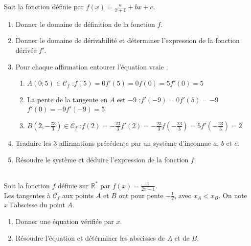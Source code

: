 \documentclass[main.tex]{subfiles}
\begin{document}
 \begin{exercise}\label{chapter04:exercice:determinerfonction02}   Soit la fonction définie  par $f(x)=\frac{a}{x+1}+bx+c$.
	\begin{enumerate}[label={\arabic*)}, leftmargin=*]
		\item Donner le domaine de définition de la fonction $f$.
		\item Donner le domaine de dérivabilité et déterminer l'expression de la fonction dérivée $f'$.
		\item Pour chaque affirmation entourer l'équation vraie :
		\begin{enumerate}[leftmargin=*]
			\item $A(0;5)\in\mathscr{C}_f$ :\hfill $f(5)=0$\hfill $f'(5)=0$\hfill $f(0)=5$\hfill $f'(0)=5$
			\item La pente de la tangente en $A$ est $-9$ :\hfill $f'(-9)=0$\hfill $f'(5)=-9$\hfill $f'(0)=-9$\hfill $f'(-9)=5$ 
			\item $B(2,-\tfrac{23}{3})\in \mathscr{C}_f$  :\hfill $f(2)=-\tfrac{23}{3}$\hfill $f'(2)=-\tfrac{23}{3}$\hfill $f(-\tfrac{23}{3})=5$\hfill $f'(-\tfrac{23}{3})=2$
		\end{enumerate}
	\item Traduire les 3 affirmations précédente par un système d'inconnue $a$, $b$ et $c$.
	\item Résoudre le système et déduire l'expression de la fonction $f$.
	\end{enumerate}
\end{exercise}
\begin{exercise} \label{chapter04:exercice:determinerfonction03}  \hfill \\Soit la fonction   $f$ définie sur $\mathbb{R}^*$ par $f(x)=\frac{1}{2x-1}$.\\
Les tangentes à $\mathscr{C}_f$ aux points $A$ et $B$ ont pour pente $-\frac{1}{2}$, avec $x_A<x_B$.  
On note $x$ l'abscisse du point $A$. 
	\begin{enumerate}[label={\arabic*)}, leftmargin=*]
	\item Donner une équation vérifiée par $x$.
	\item Résoudre l'équation et détérminer les abscisses de $A$ et de $B$.
\end{enumerate}
\end{exercise}
\end{document}

